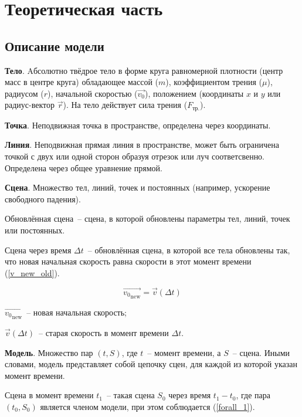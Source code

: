 \chapter{Теоретическая часть}

\section{Описание модели}

\textbf{Тело}. Aбсолютно твёдрое тело в форме круга равномерной плотности
(центр масс в центре круга) обладающее массой (\(m\)), коэффициентом трения (\(\mu\)),
радиусом (\(r\)), начальной скоростью (\(\vec{v_0}\)), положением (координаты \(x\) и \(y\) или радиус-вектор \(\vec{r}\)).
На тело действует сила трения (\(F_\text{тр.}\)). \TODO

\textbf{Точка}. Неподвижная точка в пространстве, определена через координаты.

\textbf{Линия}. Неподвижная прямая линия в пространстве, может быть ограничена точкой с двух или
одной сторон образуя отрезок или луч соответсвенно. Определена через общее уравнение прямой.

\textbf{Сцена}. Множество тел, линий, точек и постоянных (например, ускорение свободного падения).

Обновлённая сцена~-- сцена, в которой обновлены параметры тел, линий, точек или постоянных.

Сцена через время \(\Delta t\)~-- обновлённая сцена, в которой все тела обновлены так,
что новая начальная скорость равна скорости в этот момент времени (\ref{v_new_old}).

\begin{equation}\label{v_new_old}
  \vec{{v_0}_\text{new}} = \vec{v}(\Delta t)
\end{equation}

\begin{Underequation}
  \(\vec{{v_0}_\text{new}}\)~-- новая начальная скорость;

  \(\vec{v}(\Delta t)\)~-- старая скорость в момент времени \(\Delta t\).
\end{Underequation}

\textbf{Модель}. Множество пар \((t, S)\), где \(t\)~-- момент времени, а \(S\)~-- сцена.
Иными словами, модель представляет собой цепочку сцен, для каждой из которой указан момент времени.

Сцена в момент времени \(t_1\)~-- такая сцена \(S_0\) через время \(t_1 - t_0\),
где пара \((t_0, S_0)\) является членом модели, при этом соблюдается (\ref{forall_1}).

